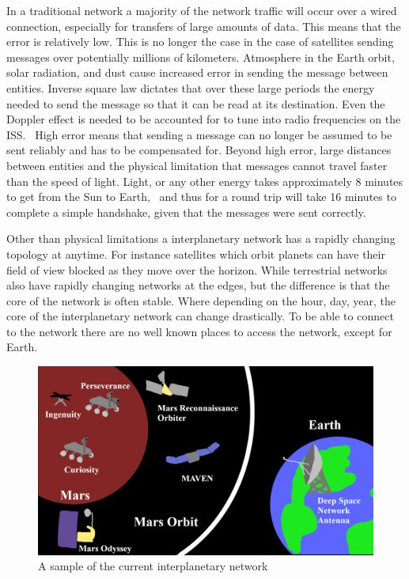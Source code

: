 \documentclass[a4paper,12pt]{article}
\begin{document}
In a traditional network a majority of the network traffic will occur over a
wired connection, especially for transfers of large amounts of data. This means
that the error is relatively low. This is no longer the case in the case of
satellites sending messages over potentially millions of kilometers. Atmosphere
in the Earth orbit, solar radiation, and dust cause increased error in sending
the message between entities. Inverse square law dictates that over these large
periods the energy needed to send the message so that it can be read at its
destination. Even the Doppler effect is needed to be accounted for to tune into
radio frequencies on the ISS.~\cite{qslCompensatingDoppler} High error means
that sending a message can no longer be assumed to be sent reliably and has to
be compensated for. Beyond high error, large distances between entities and the
physical limitation that messages cannot travel faster than the speed of light.
Light, or any other energy takes approximately 8 minutes to get from the Sun to
Earth,~\cite{nasa_earth} and thus for a round trip will take 16 minutes to
complete a simple handshake, given that the messages were sent correctly.

Other than physical limitations a interplanetary network has a rapidly changing
topology at anytime. For instance satellites which orbit planets can have their
field of view blocked as they move over the horizon. While terrestrial networks
also have rapidly changing networks at the edges, but the difference is that the
core of the network is often stable. Where depending on the hour, day, year, the
core of the interplanetary network can change drastically. To be able to connect
to the network there are no well known places to access the network, except for
Earth.

\begin{figure}[h]
  \centering
  \includegraphics[width=\textwidth]{media/ipn.png}
  \caption{A sample of the current interplanetary network}
\end{figure}
\end{document}
